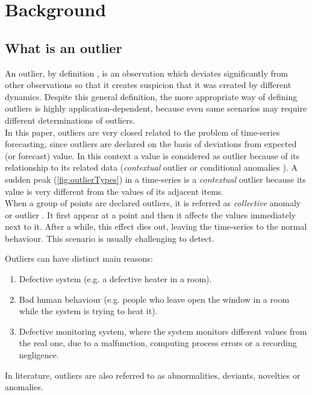 \documentclass{sig-alternate-sigmod07}
\begin{document}
\section{Background}

\subsection{What is an outlier}
An outlier, by definition \cite{hawkins1980identification}, is an observation which deviates significantly from other observations so that it creates suspicion that it was created by different dynamics. Despite this general definition, the more appropriate way of defining outliers is highly application-dependent, because even same scenarios may require different determinations of outliers. \\
In this paper, outliers are very closed related to the problem of time-series forecasting, since outliers are declared on the basis of deviations from expected (or forecast) value. In this context a value is considered as outlier because of its relationship to its related data (\emph{contextual} outlier \cite{aggarwal2013outlier} or conditional anomalies \cite{song2007conditional}). A sudden peak (\cref{fig:outlierTypes}) in a time-series is a \emph{contextual} outlier because its value is very different from the values of its adjacent items.\\
When a group of points are declared outliers, it is referred as \emph{collective} anomaly or outlier \cite{aggarwal2013outlier}. It first appear at a point and then it affects the values immediately next to it. After a while, this effect dies out, leaving the time-series to the normal behaviour. This scenario is usually challenging to detect.

 Outliers can have distinct main reasons: 
\begin{enumerate}
  \item Defective system (e.g. a defective heater in a room).
  \item Bad human behaviour (e.g. people who leave open the window in a room while the system is trying to heat it).
  \item Defective monitoring system, where the system monitors different values from the real one, due to a malfunction, computing process errors or a recording negligence. 
\end{enumerate}

In literature, outliers are also referred to as abnormalities, deviants, novelties or anomalies.
\end{document}

